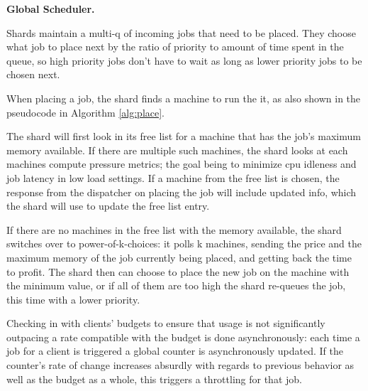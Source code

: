 \textbf{Global Scheduler.}

Shards maintain a multi-q of incoming jobs that need to be placed. They choose
what job to place next by the ratio of priority to amount of time spent in the
queue, so high priority jobs don't have to wait as long as lower priority jobs
to be chosen next.

When placing a job, the shard finds a machine to run the it, as also shown in
the pseudocode in Algorithm \ref{alg:place}. 

The shard will first look in its free list for a machine that has the job's
maximum memory available. If there are multiple such machines, the shard looks
at each machines compute pressure metrics; the goal being to minimize cpu
idleness and job latency in low load settings. If a machine from the free list is chosen, the
response from the dispatcher on placing the job will include updated info,
which the shard will use to update the free list entry.

If there are no machines in the free list with the memory available, the shard
switches over to power-of-k-choices: it polls k machines, sending the price and
the maximum memory of the job currently being placed, and getting back the time
to profit. The shard then can choose to place the new job on the machine with
the minimum value, or if all of them are too high the shard re-queues the job,
this time with a lower priority.

Checking in with clients' budgets to ensure that usage is not significantly
outpacing a rate compatible with the budget is done asynchronously: each time a
job for a client is triggered a global counter is asynchronously updated. If the
counter's rate of change increases absurdly with regards to previous behavior as
well as the budget as a whole, this triggers a throttling for that job.
